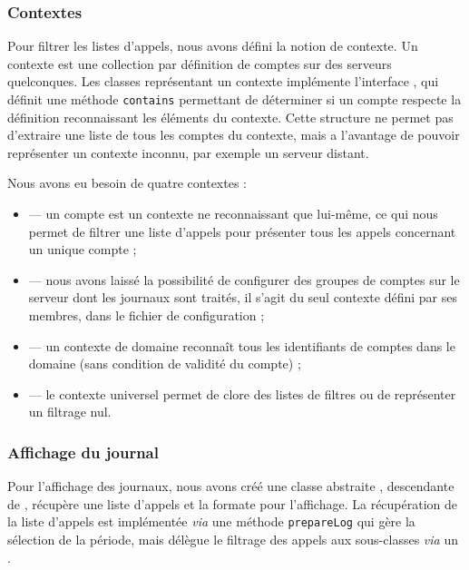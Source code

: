 \subsubsection{Contextes}

Pour filtrer les listes d’appels, nous avons défini la notion de contexte. Un contexte est une collection par définition de comptes sur des serveurs quelconques. Les classes représentant un contexte implémente l’interface , qui définit une méthode \texttt{contains} permettant de déterminer si un compte respecte la définition reconnaissant les éléments du contexte. Cette structure ne permet pas d’extraire une liste de tous les comptes du contexte, mais a l’avantage de pouvoir représenter un contexte inconnu, par exemple un serveur distant.

Nous avons eu besoin de quatre contextes :
\begin{itemize}
	\item {} — un compte est un contexte ne reconnaissant que lui-même, ce qui nous permet de filtrer une liste d’appels pour présenter tous les appels concernant un unique compte ;
	\item {} — nous avons laissé la possibilité de configurer des groupes de comptes sur le serveur dont les journaux sont traités, il s’agit du seul contexte défini par ses membres, dans le fichier de configuration ;
	\item {} — un contexte de domaine reconnaît tous les identifiants de comptes dans le domaine (sans condition de validité du compte) ;
	\item {} — le contexte universel permet de clore des listes de filtres ou de représenter un filtrage nul.
\end{itemize}

\subsubsection{Affichage du journal}

Pour l’affichage des journaux, nous avons créé une classe abstraite , descendante de , récupère une liste d’appels  et la formate pour l’affichage. La récupération de la liste d’appels est implémentée \textit{via} une méthode \texttt{prepareLog} qui gère la sélection de la période, mais délègue le filtrage des appels aux sous-classes \textit{via} un .


